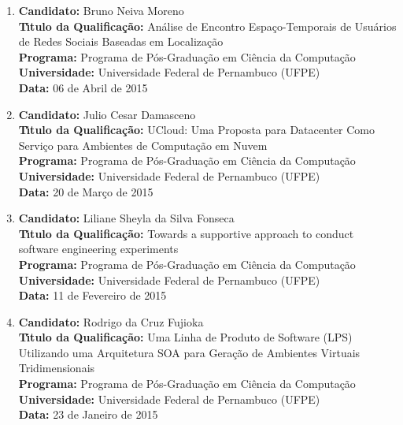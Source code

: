 \documentclass[a4paper,oneside,10pt]{article}
\begin{document}
\begin{enumerate}
\item       \textbf{Candidato:} Bruno Neiva Moreno \mbox{} \\
            \textbf{T\'{\i}tulo da Qualifica\c{c}\~{a}o:} Análise de Encontro Espaço-Temporais de Usuários de Redes Sociais Baseadas em Localização\\
            \textbf{Programa:} Programa de Pós-Graduação em Ciência da Computação\\
            \textbf{Universidade:} Universidade Federal de Pernambuco (UFPE)\\
            \textbf{Data:} 06 de Abril de 2015

\item       \textbf{Candidato:} Julio Cesar Damasceno \mbox{} \\
            \textbf{T\'{\i}tulo da Qualifica\c{c}\~{a}o:} UCloud: Uma Proposta para Datacenter Como Serviço para Ambientes de Computação em Nuvem\\
            \textbf{Programa:} Programa de Pós-Graduação em Ciência da Computação\\
            \textbf{Universidade:} Universidade Federal de Pernambuco (UFPE)\\
            \textbf{Data:} 20 de Março de 2015

\item       \textbf{Candidato:} Liliane Sheyla da Silva Fonseca \mbox{} \\
            \textbf{T\'{\i}tulo da Qualifica\c{c}\~{a}o:} Towards a supportive approach to conduct software engineering experiments\\
            \textbf{Programa:} Programa de Pós-Graduação em Ciência da Computação\\
            \textbf{Universidade:} Universidade Federal de Pernambuco (UFPE)\\
            \textbf{Data:} 11 de Fevereiro de 2015

\item       \textbf{Candidato:} Rodrigo da Cruz Fujioka \mbox{} \\
            \textbf{T\'{\i}tulo da Qualifica\c{c}\~{a}o:} Uma Linha de Produto de Software (LPS) Utilizando uma Arquitetura SOA para Geração de Ambientes Virtuais Tridimensionais\\
            \textbf{Programa:} Programa de Pós-Graduação em Ciência da Computação\\
            \textbf{Universidade:} Universidade Federal de Pernambuco (UFPE)\\
            \textbf{Data:} 23 de Janeiro de 2015


\end{enumerate}
\end{document}
